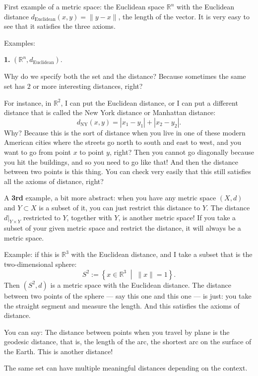 \begin{spoken-clean}[01:16:09 - 01:19:28]
First example of a metric space: the Euclidean space $\mathbb{R}^n$ with the Euclidean distance $d_{\text{Euclidean}}(x, y) = \|y - x\|$, the length of the vector. It is very easy to see that it satisfies the three axioms.

Examples:

\textbf{1.} $(\mathbb{R}^n, d_{\text{Euclidean}})$.

Why do we specify both the set and the distance? Because sometimes the same set has $2$ or more interesting distances, right?

For instance, in $\mathbb{R}^2$, I can put the Euclidean distance, or I can put a different distance that is called the New York distance or Manhattan distance:
\[
d_{\text{NY}}(x, y) = |x_1 - y_1| + |x_2 - y_2|.
\]
Why? Because this is the sort of distance when you live in one of these modern American cities where the streets go north to south and east to west, and you want to go from point $x$ to point $y$, right? Then you cannot go diagonally because you hit the buildings, and so you need to go like that! And then the distance between two points is this thing. You can check very easily that this still satisfies all the axioms of distance, right?

A \textbf{3rd} example, a bit more abstract: when you have any metric space $(X, d)$ and $Y \subset X$ is a subset of it, you can just restrict this distance to $Y$. The distance $d|_{Y \times Y}$ restricted to $Y$, together with $Y$, is another metric space! If you take a subset of your given metric space and restrict the distance, it will always be a metric space.

Example: if this is $\mathbb{R}^3$ with the Euclidean distance, and I take a subset that is the two-dimensional sphere:
\[
S^2 := \left\{ x \in \mathbb{R}^3 \;\middle|\; \|x\| = 1 \right\}.
\]
Then $(S^2, d)$ is a metric space with the Euclidean distance. The distance between two points of the sphere --- say this one and this one --- is just: you take the straight segment and measure the length. And this satisfies the axioms of distance.

You can say:  The distance between points when you travel by plane is the geodesic distance, that is, the length of the arc, the shortest arc on the surface of the Earth. This is another distance!

The same set can have multiple meaningful distances depending on the context.
\end{spoken-clean}

